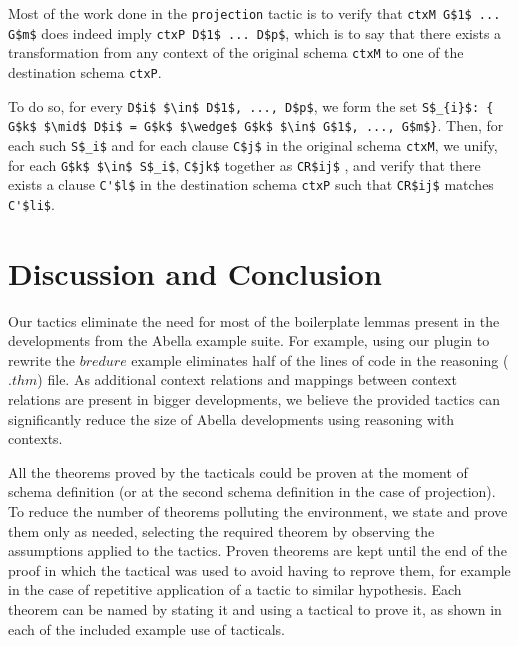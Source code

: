 \documentclass[nocopyrightspace,authoryear]{sigplanconf}
\begin{document}
Most of the work done in the \lstinline|projection| tactic is to verify that \lstinline|ctxM G$1$ ... G$m$| does indeed imply \lstinline|ctxP D$1$ ... D$p$|, which is to say that there exists a transformation from any context of the original schema \lstinline|ctxM| to one of the destination schema \lstinline|ctxP|.

To do so, for every \lstinline|D$i$ $\in$ D$1$, ..., D$p$|, we form the set 
\lstinline|S$_{i}$: { G$k$ $\mid$ D$i$ = G$k$ $\wedge$ G$k$ $\in$ G$1$, ..., G$m$}|. 
Then, for each such \lstinline|S$_i$| and for each clause \lstinline|C$j$| in the original schema \lstinline|ctxM|, we unify, for each \lstinline|G$k$ $\in$ S$_i$|, \lstinline|C$jk$| together as \lstinline|CR$ij$| , and verify that there exists a clause \lstinline|C'$l$| in the destination schema \lstinline|ctxP| such that \lstinline|CR$ij$| matches \lstinline|C'$li$|.


\begin{comment}
The $i$th context relations \lstinline|S| can be used as the $j$th projection of a context relations \lstinline|S'| if, for each clauses \lstinline|C| of \lstinline|S|, there exists a clause \lstinline|C'| of \lstinline|S'| s.t. the $i$th formula of \lstinline|C| matches the $j$th formula of \lstinline|C'|, which is to say that the $j$th projection of the schema \lstinline|S'| is more general than the $i$th projection schema \lstinline|S| .
\end{comment}


\section{Discussion and Conclusion}
Our tactics eliminate the need for most of the boilerplate lemmas present in the developments from the Abella example suite. For example, using our plugin to rewrite the $bredure$ example eliminates half of the lines of code in the reasoning ($.thm$) file. As additional context relations and mappings between context relations are present in bigger developments, we believe the provided tactics can significantly reduce the size of Abella developments using reasoning with contexts.

All the theorems proved by the tacticals could be proven at the moment of schema definition (or at the second schema definition in the case of projection). To reduce the number of theorems polluting the environment, we state and prove them only as needed, selecting the required theorem by observing the assumptions applied to the tactics. Proven theorems are kept until the end of the proof in which the tactical was used to avoid having to reprove them, for example in the case of repetitive application of a tactic to similar hypothesis. Each theorem can be named by stating it and using a tactical to prove it, as shown in each of the included example use of tacticals.
\end{document}
